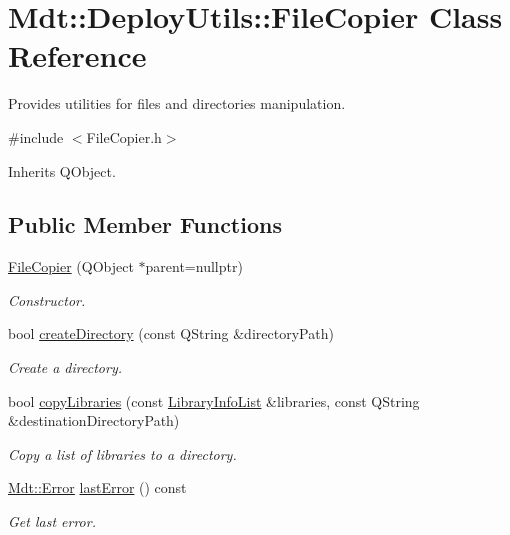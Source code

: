 \hypertarget{class_mdt_1_1_deploy_utils_1_1_file_copier}{}\section{Mdt\+:\+:Deploy\+Utils\+:\+:File\+Copier Class Reference}
\label{class_mdt_1_1_deploy_utils_1_1_file_copier}


Provides utilities for files and directories manipulation.  




{\ttfamily \#include $<$File\+Copier.\+h$>$}



Inherits Q\+Object.

\subsection*{Public Member Functions}
\begin{DoxyCompactItemize}
\item 
\hyperlink{class_mdt_1_1_deploy_utils_1_1_file_copier_af21c6f7e6fc3074e2fed28d127b29edf}{File\+Copier} (Q\+Object $\ast$parent=nullptr)
\begin{DoxyCompactList}\small\item\em Constructor. \end{DoxyCompactList}\item 
bool \hyperlink{class_mdt_1_1_deploy_utils_1_1_file_copier_ab1040ccbe34149841a42191e7ced3ba4}{create\+Directory} (const Q\+String \&directory\+Path)
\begin{DoxyCompactList}\small\item\em Create a directory. \end{DoxyCompactList}\item 
bool \hyperlink{class_mdt_1_1_deploy_utils_1_1_file_copier_ab81974d2e6e5b2260a8147c3400dcb3a}{copy\+Libraries} (const \hyperlink{class_mdt_1_1_deploy_utils_1_1_library_info_list}{Library\+Info\+List} \&libraries, const Q\+String \&destination\+Directory\+Path)
\begin{DoxyCompactList}\small\item\em Copy a list of libraries to a directory. \end{DoxyCompactList}\item 
\hyperlink{class_mdt_1_1_error}{Mdt\+::\+Error} \hyperlink{class_mdt_1_1_deploy_utils_1_1_file_copier_a8e82df0b666b0cdb45edd878af31893f}{last\+Error} () const 
\begin{DoxyCompactList}\small\item\em Get last error. \end{DoxyCompactList}\end{DoxyCompactItemize}


